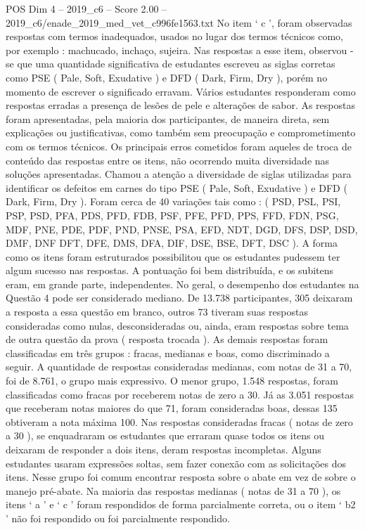 \begin{textsample}{POS Dim 4 – 2019\_c6 – Score 2.00 – 2019\_c6/enade\_2019\_med\_vet\_c996fe1563.txt}
No item ‘ c ’, foram observadas respostas com termos inadequados, usados no lugar dos termos técnicos como, por exemplo : machucado, inchaço, sujeira.
Nas respostas a esse item, observou -se que uma quantidade significativa de estudantes escreveu as siglas corretas como PSE ( Pale, Soft, Exudative ) e DFD ( Dark, Firm, Dry ), porém no momento de escrever o significado erravam.
Vários estudantes responderam como respostas erradas a presença de lesões de pele e alterações de sabor.
As respostas foram apresentadas, pela maioria dos participantes, de maneira direta, sem explicações ou justificativas, como também sem preocupação e comprometimento com os termos técnicos.
Os principais erros cometidos foram aqueles de troca de conteúdo das respostas entre os itens, não ocorrendo muita diversidade nas soluções apresentadas.
Chamou a atenção a diversidade de siglas utilizadas para identificar os defeitos em carnes do tipo PSE ( Pale, Soft, Exudative ) e DFD ( Dark, Firm, Dry ).
Foram cerca de 40 variações tais como : ( PSD, PSL, PSI, PSP, PSD, PFA, PDS, PFD, FDB, PSF, PFE, PFD, PPS, FFD, FDN, PSG, MDF, PNE, PDE, PDF, PND, PNSE, PSA, EFD, NDT, DGD, DFS, DSP, DSD, DMF, DNF DFT, DFE, DMS, DFA, DIF, DSE, BSE, DFT, DSC ).
A forma como os itens foram estruturados possibilitou que os estudantes pudessem ter algum sucesso nas respostas.
A pontuação foi bem distribuída, e os subitens eram, em grande parte, independentes.
No geral, o desempenho dos estudantes na Questão 4 pode ser considerado mediano.
De 13.738 participantes, 305 deixaram a resposta a essa questão em branco, outros 73 tiveram suas respostas consideradas como nulas, desconsideradas ou, ainda, eram respostas sobre tema de outra questão da prova ( resposta trocada ).
As demais respostas foram classificadas em três grupos : fracas, medianas e boas, como discriminado a seguir.
A quantidade de respostas consideradas medianas, com notas de 31 a 70, foi de 8.761, o grupo mais expressivo.
O menor grupo, 1.548 respostas, foram classificadas como fracas por receberem notas de zero a 30.
Já as 3.051 respostas que receberam notas maiores do que 71, foram consideradas boas, dessas 135 obtiveram a nota máxima 100.
Nas respostas consideradas fracas ( notas de zero a 30 ), se enquadraram os estudantes que erraram quase todos os itens ou deixaram de responder a dois itens, deram respostas incompletas.
Alguns estudantes usaram expressões soltas, sem fazer conexão com as solicitações dos itens.
Nesse grupo foi comum encontrar resposta sobre o abate em vez de sobre o manejo pré-abate.
Na maioria das respostas medianas ( notas de 31 a 70 ), os itens ‘ a ’ e ‘ c ’ foram respondidos de forma parcialmente correta, ou o item ‘ b2 ’ não foi respondido ou foi parcialmente respondido.

\end{textsample}
